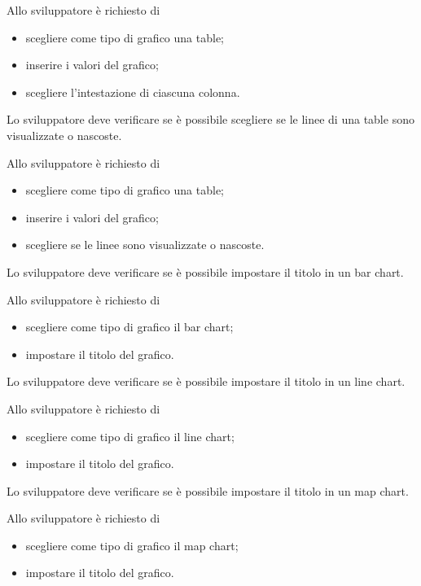 		Allo sviluppatore è richiesto di
		\begin{itemize}
			\item scegliere come tipo di grafico una table;
			\item inserire i valori del grafico;
			\item scegliere l'intestazione di ciascuna colonna.
		\end{itemize}

	Lo sviluppatore deve verificare se è possibile scegliere se le linee di una table sono visualizzate o nascoste.

		Allo sviluppatore è richiesto di
		\begin{itemize}
			\item scegliere come tipo di grafico una table;
			\item inserire i valori del grafico;
			\item scegliere se le linee sono visualizzate o nascoste.
		\end{itemize}

	Lo sviluppatore deve verificare se è possibile impostare il titolo in un bar chart.

		Allo sviluppatore è richiesto di
		\begin{itemize}
			\item scegliere come tipo di grafico il bar chart;
			\item impostare il titolo del grafico.
		\end{itemize}

	Lo sviluppatore deve verificare se è possibile impostare il titolo in un line chart.

		Allo sviluppatore è richiesto di
		\begin{itemize}
			\item scegliere come tipo di grafico il line chart;
			\item impostare il titolo del grafico.
		\end{itemize}

	Lo sviluppatore deve verificare se è possibile impostare il titolo in un map chart.

		Allo sviluppatore è richiesto di
		\begin{itemize}
			\item scegliere come tipo di grafico il map chart;
			\item impostare il titolo del grafico.
		\end{itemize}

